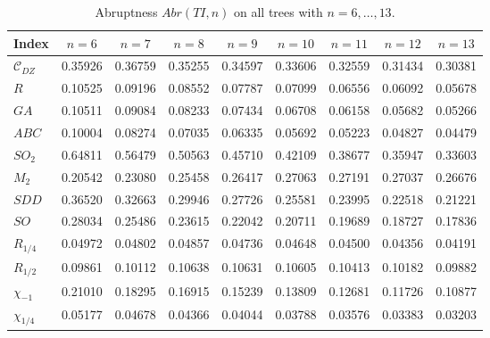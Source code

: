\documentclass[11pt,a4paper]{article}
\theoremstyle{plain}
\theoremstyle{definition}
\theoremstyle{remark}
\newcommand{\CDZ}{\mathcal{C}_{DZ}}
\begin{document}
\begin{table}[htbp]
\centering
\small
\setlength{\tabcolsep}{4pt}
\caption{Abruptness $Abr(TI,n)$ on all trees with $n=6,\dots,13$.}
\label{tab:abr}
\begin{tabular}{lcccccccc}
\toprule
Index & $n{=}6$ & $n{=}7$ & $n{=}8$ & $n{=}9$ & $n{=}10$ & $n{=}11$ & $n{=}12$ & $n{=}13$ \\
\midrule
$\CDZ$       & 0.35926 & 0.36759 & 0.35255 & 0.34597 & 0.33606 & 0.32559 & 0.31434 & 0.30381 \\
$R$          & 0.10525 & 0.09196 & 0.08552 & 0.07787 & 0.07099 & 0.06556 & 0.06092 & 0.05678 \\
$GA$         & 0.10511 & 0.09084 & 0.08233 & 0.07434 & 0.06708 & 0.06158 & 0.05682 & 0.05266 \\
$ABC$        & 0.10004 & 0.08274 & 0.07035 & 0.06335 & 0.05692 & 0.05223 & 0.04827 & 0.04479 \\
$SO_2$       & 0.64811 & 0.56479 & 0.50563 & 0.45710 & 0.42109 & 0.38677 & 0.35947 & 0.33603 \\
$M_2$        & 0.20542 & 0.23080 & 0.25458 & 0.26417 & 0.27063 & 0.27191 & 0.27037 & 0.26676 \\
$SDD$        & 0.36520 & 0.32663 & 0.29946 & 0.27726 & 0.25581 & 0.23995 & 0.22518 & 0.21221 \\
$SO$         & 0.28034 & 0.25486 & 0.23615 & 0.22042 & 0.20711 & 0.19689 & 0.18727 & 0.17836 \\
$R_{1/4}$    & 0.04972 & 0.04802 & 0.04857 & 0.04736 & 0.04648 & 0.04500 & 0.04356 & 0.04191 \\
$R_{1/2}$    & 0.09861 & 0.10112 & 0.10638 & 0.10631 & 0.10605 & 0.10413 & 0.10182 & 0.09882 \\
$\chi_{-1}$  & 0.21010 & 0.18295 & 0.16915 & 0.15239 & 0.13809 & 0.12681 & 0.11726 & 0.10877 \\
$\chi_{1/4}$ & 0.05177 & 0.04678 & 0.04366 & 0.04044 & 0.03788 & 0.03576 & 0.03383 & 0.03203 \\
\bottomrule
\end{tabular}
\end{table}
\end{document}
